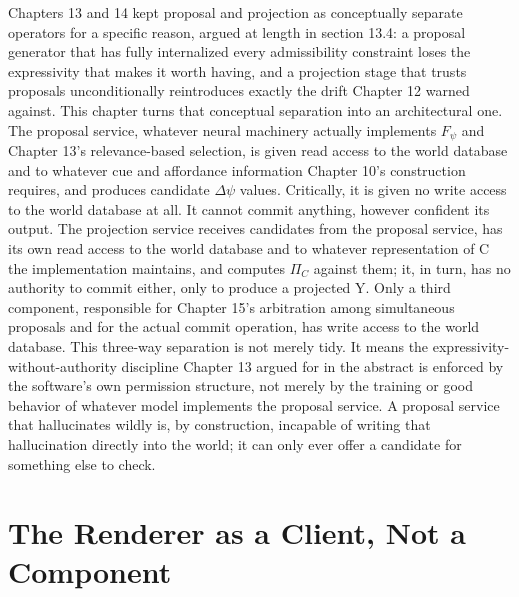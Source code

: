 Chapters 13 and 14 kept proposal and projection as conceptually separate operators for a specific reason, argued at length in section 13.4: a proposal generator that has fully internalized every admissibility constraint loses the expressivity that makes it worth having, and a projection stage that trusts proposals unconditionally reintroduces exactly the drift Chapter 12 warned against. This chapter turns that conceptual separation into an architectural one. The proposal service, whatever neural machinery actually implements \(F_\psi\) and Chapter 13's relevance-based selection, is given read access to the world database and to whatever cue and affordance information Chapter 10's construction requires, and produces candidate \(\Delta\psi\) values. Critically, it is given no write access to the world database at all. It cannot commit anything, however confident its output. The projection service receives candidates from the proposal service, has its own read access to the world database and to whatever representation of C the implementation maintains, and computes \(\Pi_C\) against them; it, in turn, has no authority to commit either, only to produce a projected Y. Only a third component, responsible for Chapter 15's arbitration among simultaneous proposals and for the actual commit operation, has write access to the world database. This three-way separation is not merely tidy. It means the expressivity-without-authority discipline Chapter 13 argued for in the abstract is enforced by the software's own permission structure, not merely by the training or good behavior of whatever model implements the proposal service. A proposal service that hallucinates wildly is, by construction, incapable of writing that hallucination directly into the world; it can only ever offer a candidate for something else to check.

\section{The Renderer as a Client, Not a Component}

